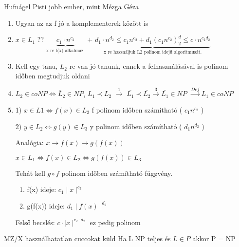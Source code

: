 \begin{bizonyitas}{Hufnágel Pisti jobb ember, mint Mézga Géza}

		\begin{enumerate}[itemsep=1mm]
	 	\item Ugyan az az f jó a komplementerek között is
	 	\item $x \in L_1$ ?? $\underbrace{ c_1 \cdot n^{c_2} }_\text{x re f(x) alkalmaz }$
	 			$+$
	 			$\underbrace{ d_1\cdot n^{d_2} \leq c_1 n^{c_2} + d_1 (c_1 n^{c_2})^d_2 \leq c\cdot n^{c_2 d_2} }_\text{x re használjuk L2 polinom idejű algoritmusát.}$  %

	 	\item Kell egy tanu, $L_2$ re van jó tanunk, ennek a felhasználásával is polinom időben megtudjuk oldani

	 	\item $L_2 \in coNP \Leftrightarrow \overline L_2 \in NP$, $L_1 \prec L_2$
	 	$\xrightarrow{1}$ $\overline{L_1} \prec \overline{L_2}
	 	\xrightarrow{3} \overline {L_1} \in NP$
	 	$\xrightarrow{Def} L_1 \in coNP$

	 	\item 1) $x \in L1 \Leftrightarrow f(x) \in L_2$ f polinom időben számítható ( $c_1 n^{c_2}$ )

	 	2) $y \in L_2 \Leftrightarrow g(y)  \in L_3$ y polinom időben számítható ( $d_1 n^{d_2}$ )

	 	Analógia: $x \rightarrow f(x) \rightarrow g(f(x))$

$x \in L_1 \Leftrightarrow f(x) \in L_2 \Leftrightarrow g(f(x)) \in L_3$

	 	Tehát kell $g \circ f$ polinom időben számítható függvény.

	 	\begin{enumerate}[itemsep=1mm]
	 		\item f(x) ideje: $c_1 \mid x \mid^{c_2}$
	 		\item g(f(x)) ideje: $d_1 \mid f(x)\mid^{d_2}$
	 	\end{enumerate}

	 	Felső becslés: $c \cdot \mid x\mid^{c_2\cdot d_2}$ ez pedig polinom


	 \end{enumerate}
\end{bizonyitas}

	\begin{tetel}{MZ/X használhatatlan cuccokat küld}
   Ha L NP teljes és $L\in P$ akkor P = NP\\[3pt]
   \end{tetel}

